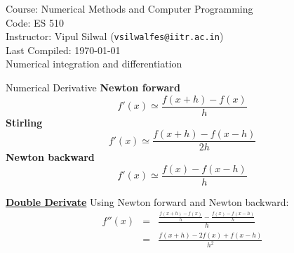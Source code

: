 \documentclass[11pt,titlepage,fleqn]{article}
\begin{document}
\noindent Course: Numerical Methods and Computer Programming\\
\noindent Code: ES 510\\
\noindent Instructor: Vipul Silwal (\verb+vsilwalfes@iitr.ac.in+) \\ 
\noindent Last Compiled: \today \\

{\huge Numerical integration and differentiation}

\tableofcontents 


\begin{section}{Numerical Derivative}
{\bf Newton forward}
\begin{equation}
f'(x) \simeq \frac{f(x+h) - f(x)}{h}
\end{equation}
{\bf Stirling}
\begin{equation}
f'(x) \simeq \frac{f(x+h) - f(x-h)}{2h}
\end{equation}
{\bf Newton backward}
\begin{equation}
f'(x) \simeq \frac{f(x) - f(x-h)}{h}
\end{equation}

\underline{\bf Double Derivate}
Using Newton forward and Newton backward:
\begin{eqnarray}
f''(x) &=& \frac{\frac{f(x+h) - f(x)}{h} - \frac{f(x) - f(x-h)}{h}}{h}\\
&=& \frac{f(x+h) - 2f(x) + f(x-h)}{h^2}
\end{eqnarray}
\end{section}
\end{document}
